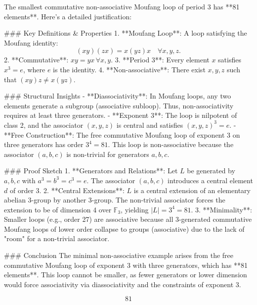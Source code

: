 \documentclass[12p]{article}
\newcounter{answercounter}
\newenvironment{answer}[1][]
{\refstepcounter{answercounter}%
\begin{tcolorbox}[
    title=Answer \theanswercounter: #1,
    colback=white, %
    colframe=gray,
    coltext=black, %
    fonttitle=\bfseries\normalsize,
    top=2mm,
    bottom=2mm,
    enlarge top initially by=5mm
]
\small
}
{\end{tcolorbox}}
\begin{document}
\begin{answer}
The smallest commutative non-associative Moufang loop of period 3 has **81 elements**. Here's a detailed justification:

### Key Definitions & Properties
1. **Moufang Loop**: A loop satisfying the Moufang identity:  
   \[
   (xy)(zx) = x(yz)x \quad \forall x,y,z.
   \]
2. **Commutative**: \( xy = yx \, \forall x,y \).
3. **Period 3**: Every element \( x \) satisfies \( x^3 = e \), where \( e \) is the identity.
4. **Non-associative**: There exist \( x,y,z \) such that \( (xy)z \neq x(yz) \).

### Structural Insights
- **Diassociativity**: In Moufang loops, any two elements generate a subgroup (associative subloop). Thus, non-associativity requires at least three generators.
- **Exponent 3**: The loop is nilpotent of class 2, and the associator \((x,y,z)\) is central and satisfies \((x,y,z)^3 = e\).
- **Free Construction**: The free commutative Moufang loop of exponent 3 on three generators has order \( 3^4 = 81 \). This loop is non-associative because the associator \((a,b,c)\) is non-trivial for generators \( a,b,c \).

### Proof Sketch
1. **Generators and Relations**: Let \( L \) be generated by \( a,b,c \) with \( a^3 = b^3 = c^3 = e \). The associator \((a,b,c)\) introduces a central element \( d \) of order 3.
2. **Central Extensions**: \( L \) is a central extension of an elementary abelian 3-group by another 3-group. The non-trivial associator forces the extension to be of dimension 4 over \( \mathbb{F}_3 \), yielding \( |L| = 3^4 = 81 \).
3. **Minimality**: Smaller loops (e.g., order 27) are associative because all 3-generated commutative Moufang loops of lower order collapse to groups (associative) due to the lack of "room" for a non-trivial associator.

### Conclusion
The minimal non-associative example arises from the free commutative Moufang loop of exponent 3 with three generators, which has **81 elements**. This loop cannot be smaller, as fewer generators or lower dimension would force associativity via diassociativity and the constraints of exponent 3.

\[
\boxed{81}
\]
\end{answer}
\end{document}
